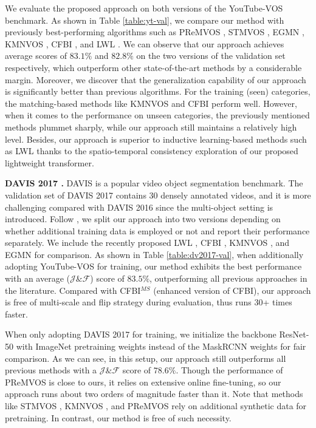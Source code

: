 \documentclass[10pt,twocolumn,letterpaper]{article}
\begin{document}
We evaluate the proposed approach on both versions of the YouTube-VOS benchmark. As shown in Table \ref{table:yt-val}, we compare our method with previously best-performing algorithms such as PReMVOS \cite{premvos2018A}, STMVOS \cite{Seoung2019A}, EGMN \cite{lu2020A}, KMNVOS \cite{Seong2020A}, CFBI \cite{CFBI2020A}, and LWL \cite{Goutam2020A}. We can observe that our approach achieves average scores of $83.1\%$ and $82.8\%$ on the two versions of the validation set respectively, which outperform other state-of-the-art methods by a considerable margin. Moreover, we discover that the generalization capability of our approach is significantly better than previous algorithms. For the training (seen) categories, the matching-based methods like KMNVOS \cite{Seong2020A} and CFBI \cite{CFBI2020A} perform well. However, when it comes to the performance on unseen categories, the previously mentioned methods plummet sharply, while our approach still maintains a relatively high level. Besides, our approach is superior to inductive learning-based methods such as LWL \cite{Goutam2020A} thanks to the spatio-temporal consistency exploration of our proposed lightweight transformer.


\noindent\textbf{DAVIS 2017 \cite{DAVIS2017}.}
DAVIS is a popular video object segmentation benchmark. The validation set of DAVIS 2017 contains 30 densely annotated videos, and it is more challenging compared with DAVIS 2016 \cite{DAVIS2016} since the multi-object setting is introduced. Follow \cite{Goutam2020A}, we split our approach into two versions depending on whether additional training data is employed or not and report their performance separately. We include the recently proposed LWL \cite{Goutam2020A}, CFBI \cite{CFBI2020A}, KMNVOS \cite{Seong2020A}, and EGMN \cite{lu2020A} for comparison. As shown in Table \ref{table:dv2017-val}, when additionally adopting YouTube-VOS for training, our method exhibits the best performance with an average ($\mathcal{J} \& \mathcal{F}$) score of $83.5\%$, outperforming all previous approaches in the literature. Compared with CFBI$^{MS}$ \cite{CFBI2020A} (enhanced version of CFBI), our approach is free of multi-scale and flip strategy during evaluation, thus runs 30+ times faster.



When only adopting DAVIS 2017 for training, we initialize the backbone ResNet-50 with ImageNet \cite{imagenet2009A} pretraining weights instead of the MaskRCNN \cite{maskrcnn2017A} weights for fair comparison. As we can see, in this setup, our approach still outperforms all previous methods with a $\mathcal{J} \& \mathcal{F}$ score of $78.6\%$.
Though the performance of PReMVOS \cite{premvos2018A} is close to ours, it relies on extensive online fine-tuning, so our approach runs about two orders of magnitude faster than it.
Note that methods like STMVOS \cite{Seoung2019A}, KMNVOS \cite{Seong2020A}, and PReMVOS \cite{premvos2018A} rely on additional synthetic data for pretraining. In contrast, our method is free of such necessity. 
\end{document}
